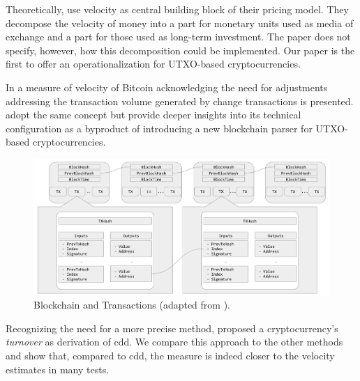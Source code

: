 

Theoretically, \cite{bolt2016value} use velocity as central building block of
their pricing model. %
They decompose the velocity of money into a part for monetary units used as
media of exchange and a part for those used as long-term investment. %
The paper does not specify, however, how this decomposition could be
implemented. %
Our paper is the first to offer an operationalization for UTXO-based
cryptocurrencies.%

In \cite{athey2016bitcoin} a measure of velocity of Bitcoin
acknowledging the need for adjustments addressing the transaction volume
generated by change transactions is presented. %
\cite{kalodner2017blocksci} adopt the same concept but provide deeper
insights into its technical configuration as a byproduct of introducing a new
blockchain parser for UTXO-based cryptocurrencies. %
%

\begin{figure}
  \centerline{%
    \ifdefined\varInputFigs%
    \includegraphics[width=0.8\linewidth]{fig/utxo_sys_HR}%
    \else%
    \fi%
  }%
  \caption{Blockchain and Transactions (adapted from \cite{tschorsch2016bitcoin}).}
  \label{fig:utxo_sys}
\end{figure}

Recognizing the need for a more precise method, \cite{smith2017bitcoin} proposed
a cryptocurrency's \textit{turnover} as derivation of \ac{cdd}. %
We compare this approach to the other methods and show that, compared to
\ac{cdd}, the measure is indeed closer to the velocity estimates in many
tests. %




